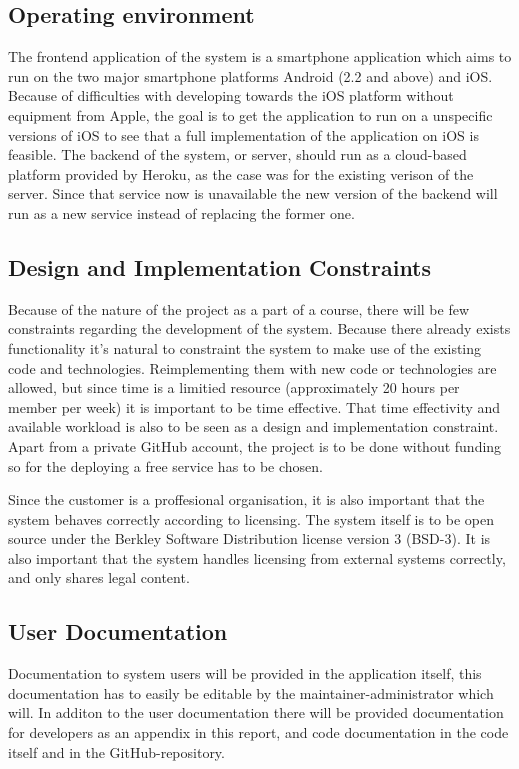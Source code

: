 \subsection{Operating environment}
The frontend application of the system is a smartphone application which aims to run on the two major smartphone platforms Android (2.2 and above) and iOS. Because of difficulties with developing towards the iOS platform without equipment from Apple, the goal is to get the application to run on a unspecific versions of iOS to see that a full implementation of the application on iOS is feasible. The backend of the system, or server, should run as a cloud-based platform provided by Heroku, as the case was for the existing verison of the server. Since that service now is unavailable the new version of the backend will run as a new service instead of replacing the former one. 

\subsection{Design and Implementation Constraints}
Because of the nature of the project as a part of a course, there will be few constraints regarding the development of the system. Because there already exists functionality it's natural to constraint the system to make use of the existing code and technologies. Reimplementing them with new code or technologies are allowed, but since time is a limitied resource (approximately 20 hours per member per week) it is important to be time effective. That time effectivity and available workload is also to be seen as a design and implementation constraint. Apart from a private GitHub account, the project is to be done without funding so for the deploying a free service has to be chosen.

\noindent

Since the customer is a proffesional organisation, it is also important that the system behaves correctly according to licensing. The system itself is to be open source under the Berkley Software Distribution license version 3 (BSD-3). It is also important that the system handles licensing from external systems correctly, and only shares legal content.

\subsection{User Documentation}

Documentation to system users will be provided in the application itself, this documentation has to easily be editable by the maintainer-administrator which will. In additon to the user documentation there will be provided documentation for developers as an appendix in this report, and code documentation in the code itself and in the GitHub-repository. 

